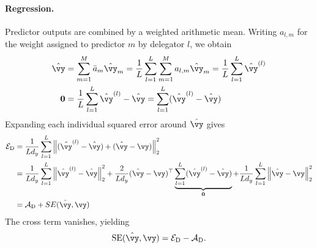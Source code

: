 \documentclass[10pt]{article} %
\newcommand{\dambiguity}{\mathcal{A}_{\mathrm{D}}}
\newcommand{\dperformance}{\mathcal{E}_{\mathrm{D}}}
\begin{document}
\paragraph{Regression.}
Predictor outputs are combined by a weighted arithmetic mean. Writing $a_{l,m}$ for the weight assigned to predictor $m$ by delegator $l$, we obtain
\begin{equation}
\begin{aligned}
    \hat{\vy}
    &=\sum_{m=1}^M\bar a_m\hat{\vy}_m
    =\frac{1}{L}\sum_{l=1}^L\sum_{m=1}^M a_{l,m}\hat{\vy}_m
    =\frac{1}{L}\sum_{l=1}^L\hat{\vy}^{(l)} \\
    \mathbf{0} &= \frac{1}{L}\sum_{l=1}^L\hat{\vy}^{(l)} - \hat{\vy} = \sum_{l=1}^L(\hat{\vy}^{(l)} - \hat{\vy})
\end{aligned}
\end{equation}
Expanding each individual squared error around $\hat{\vy}$ gives
\begin{equation}
\begin{aligned}
    \dperformance
    &=\frac{1}{Ld_y}\sum_{l=1}^L
      \left\|(\hat{\vy}^{(l)}-\hat{\vy})+(\hat{\vy}-\vy)\right\|_2^2\\
    &= \frac{1}{Ld_y}\sum_{l=1}^L \left\| \hat{\vy}^{(l)}-\hat{\vy} \right\|_2^2  + \frac{2}{Ld_y} (\hat{\vy}-\vy)^\top  \underbrace{\sum_{l=1}^L (\hat{\vy}^{(l)}-\hat{\vy})}_{\mathbf{0}}  + \frac{1}{Ld_y}\sum_{l=1}^L \left\| \hat{\vy}-\vy \right\|_2^2 \\
    &= \dambiguity + SE(\hat{\vy}, \vy)
\end{aligned}
\end{equation}
The cross term vanishes, yielding
\begin{equation}\label{eq:delegator-se-derivation}
    \mathrm{SE}(\hat{\vy},\vy)=\dperformance-\dambiguity.
\end{equation}
\end{document}
